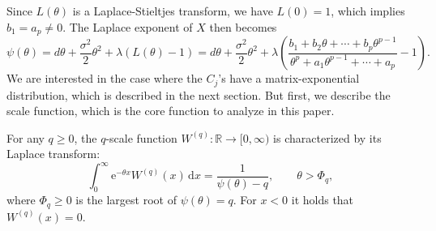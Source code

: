 \documentclass[a4paper,11pt]{article}
\numberwithin{equation}{section}
\theoremstyle{plain}
\theoremstyle{definition}
\newcommand{\1}{\mathbf{1}}
\newcommand{\e}{\mathrm{e}}
\newcommand{\dd}{\mathrm{d}}
\begin{document}
Since $L(\theta)$ is a Laplace-Stieltjes transform, we have $L(0) = 1$, which implies $b_1 = a_p \neq 0$. The Laplace exponent of $X$ then becomes
\begin{equation}\label{eq:psi_rational}
\psi(\theta) = d\theta + \frac{\sigma^2}{2}\theta^2 + \lambda(L(\theta) - 1) = d\theta + \frac{\sigma^2}{2}\theta^2 + \lambda\left(\frac{b_1 + b_2\theta + \cdots + b_p\theta^{p-1}}{\theta^p + a_1\theta^{p-1} + \cdots + a_p} - 1\right).
\end{equation}
We are interested in the case where the $C_j$'s have a matrix-exponential distribution, which is described in the next section.
But first, we describe the scale function, which is the core function to analyze in this paper. 

For any $q\geq 0$, 
the $q$-scale function $W^{(q)} : \mathbb{R} \to [0,\infty)$ is characterized by its Laplace transform:
\begin{equation}\label{eq:scale_transform}
\int_0^\infty \e^{-\theta x} W^{(q)}(x)\,\dd x = \frac{1}{\psi(\theta) - q}, \qquad \theta > \Phi_q,
\end{equation}
where $\Phi_q \ge 0$ is the largest root of $\psi(\theta) = q$.
For $x<0$ it holds that $W^{(q)}(x)=0$.
\end{document}
